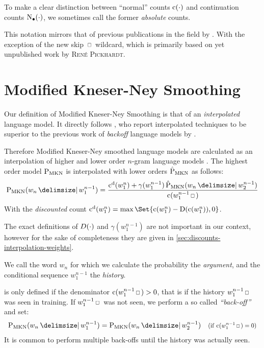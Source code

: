 To make a clear distinction between ``normal'' counts $\operatorname{c}(\cdot)$ and
continuation counts $\operatorname{N}_{\bullet}(\cdot)$, we
sometimes call the former \emph{absolute} counts.

This notation mirrors that of previous publications in the field by
\textcite{ChenGoodman1996,ChenGoodman1998,ChenGoodman1999,Goodman2001,Pickhardt2014}.
With the exception of the new skip $\Skp$ wildcard, which is primarily based
on yet unpublished work by \textsc{Ren{\'e} Pickhardt}.

\section{Modified Kneser-Ney Smoothing}
\label{sec:review-lm-mkn}

Our definition of Modified Kneser-Ney Smoothing is that of an
\emph{interpolated} language model.
It directly follows \textcite{ChenGoodman1999}, who report interpolated
techniques to be superior to the previous work of \emph{backoff} language
models by \textcite{KneserNey1995}.

Therefore Modified Kneser-Ney smoothed language models are calculated as an
interpolation of higher and lower order $n$-gram language models
\parencite{Pickhardt2014}.
The highest order model $\ProbMKN$ is interpolated with lower orders $\ProbMKN*$
as follows:
\begin{equation}
  \label{eq:mkn-high}
  \ProbMKN{w_n}{w_1^{n-1}} =
    \frac{\DiscountedCount(w_1^n) + \gamma(w_1^{n-1}) \ProbMKN*{w_n}{w_2^{n-1}}}
         {\Count(w_1^{n-1} \Skp)} \\
\end{equation}
With the \emph{discounted} count
${\DiscountedCount(w_1^n) = \max\Set{\Count(w_1^n) - \Discount(\Count(w_1^n)), 0}}$.

The exact definitions of $D(\cdot)$ and $\gamma(w_1^{n-1})$ are not
important in our context, however for the sake of completeness they are given
in \cref{sec:discounts-interpolation-weights}.

We call the word $w_n$ for which we calculate the probability the
\emph{argument}, and the conditional sequence $w_1^{n-1}$ the \emph{history}.

 is only defined if the denominator
${\Count(w_1^{n-1} \Skp) > 0}$, that is if the history $w_1^{n-1} \Skp$ was seen
in training.
If $w_1^{n-1} \Skp$ was not seen, we perform a so called \emph{``back-off''}
and set:
\begin{align}
  \label{eq:mkn-backoff}
  \ProbMKN{w_n}{w_1^{n-1}} = \ProbMKN{w_n}{w_2^{n-1}}
      & & \Condition{\Count(w_1^{n-1} \Skp) = 0}
\end{align}
It is common to perform multiple back-offs until the history was actually seen.

